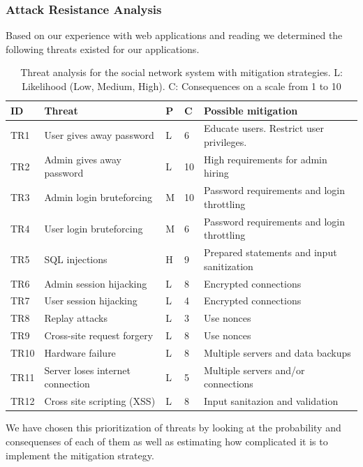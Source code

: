 \documentclass[a4paper]{article}
\begin{document}
\subsubsection{Attack Resistance Analysis}
Based on our experience with web applications and reading\cite{sins2009} we determined the following threats existed for our applications.

\begin{table}[h!]
	\begin{tabular}{| l | p{4cm} | l | l | p{5cm} |}
		\hline
		\textbf{ID} & \textbf{Threat} & \textbf{P} & \textbf{C} & \textbf{Possible mitigation} \\ \hline
		TR1 & User gives away password & L & 6 & Educate users. Restrict user privileges. \\ \hline
        TR2 & Admin gives away password & L  & 10 & High requirements for admin hiring \\ \hline
        TR3 & Admin login bruteforcing & M & 10 & Password requirements and login throttling \\ \hline
        TR4 & User login bruteforcing & M & 6 & Password requirements and login throttling \\ \hline
        TR5 & SQL injections & H & 9 & Prepared statements and input sanitization \\ \hline
        TR6 & Admin session hijacking & L & 8 & Encrypted connections \\ \hline
        TR7 & User session hijacking & L & 4 & Encrypted connections \\ \hline
        TR8 & Replay attacks & L & 3 & Use nonces \\ \hline
       	TR9 & Cross-site request forgery & L & 8 & Use nonces \\ \hline
        TR10 & Hardware failure & L & 8 & Multiple servers and data backups \\ \hline
        TR11 & Server loses internet connection & L & 5 & Multiple servers and/or connections \\ \hline
        TR12 & Cross site scripting (XSS) & L & 8 & Input sanitazion and validation \\ \hline
	\end{tabular}
	\caption{Threat analysis for the social network system with mitigation strategies. L: Likelihood (Low, Medium, High). C: Consequences on a scale from 1 to 10}
		\label{tab:threats}
\end{table}



We have chosen this prioritization of threats by looking at the probability and consequenses of each of them as well as estimating how complicated it is to implement the mitigation strategy.
\end{document}
